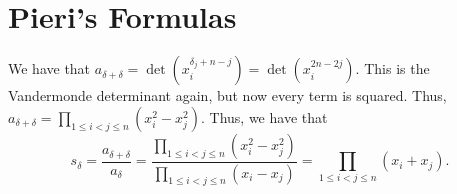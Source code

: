 \documentclass[letterpaper, 11pt, oneside]{book}
\begin{document}
\clearpage

\section{Pieri's Formulas}

\begin{sol}\label{ex:Manivel_1.2.4}
  We have that $a_{\delta + \delta} = \det(x_{i}^{\delta_{j} + n - j}) = \det(x_{i}^{2n - 2j})$.
  This is the Vandermonde determinant again, but now every term is squared.
  Thus, $a_{\delta + \delta} = \prod_{1 \leq i < j \leq n} (x_{i}^{2} - x_{j}^{2})$.
  Thus, we have that
  \[
    s_{\delta} = \frac{a_{\delta + \delta}}{a_{\delta}} = \frac{\prod_{1 \leq i < j \leq n} (x_{i}^{2} - x_{j}^{2})}{\prod_{1 \leq i < j \leq n} (x_{i} - x_{j})} = \prod_{1 \leq i < j \leq n} (x_{i} + x_{j}).
  \]
\end{sol}

\printbibliography
\end{document}
